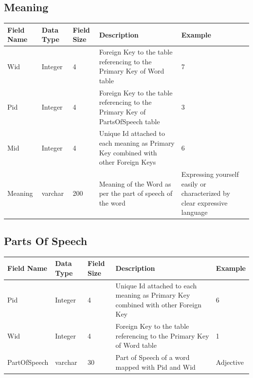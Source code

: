 \documentclass{article}
\begin{document}
\pagebreak
\subsection*{Meaning}
\begin{center}
\begin{tabular}{ |m{2em}|m{2em}|m{2em}|m{7cm}|m{2cm}| } 
 \hline
\large\textbf{Field Name} & \large\textbf{Data Type} & \large\textbf{Field Size} & \large\textbf{Description} & \large\textbf{Example}\\  
 \hline
\small Wid & \small Integer &\small 4 &\small Foreign Key to the table referencing to the Primary Key of Word table &\small 7    \\
\hline
\small Pid & \small Integer &\small 4 &\small Foreign Key to the table referencing to the Primary Key of PartsOfSpeech table &\small 3 \\
\hline
\small Mid & \small Integer &\small 4 &\small Unique Id attached to each meaning as Primary Key combined with other Foreign Keys &\small 6 \\ 
\hline
\small Meaning & \small varchar &\small 200 &\small Meaning of the Word as per the part of speech of the word &\small Expressing yourself easily or characterized by clear expressive language \\
\hline
\end{tabular}
\end{center}

\subsection*{Parts Of Speech}
\begin{center}
\begin{tabular}{ |m{2em}|m{2em}|m{2em}|m{7cm}|m{2cm}| } 
 \hline
\large\textbf{Field Name} & \large\textbf{Data Type} & \large\textbf{Field Size} & \large\textbf{Description} & \large\textbf{Example}\\  
 \hline
\small Pid & \small Integer &\small 4 &\small Unique Id attached to each meaning as Primary Key combined with other Foreign Key &\small 6 \\
\hline
\small Wid & \small Integer &\small 4 &\small Foreign Key to the table referencing to the Primary Key of Word table &\small 1 \\
\hline
\small PartOfSpeech & \small varchar &\small 30 &\small Part of Speech of a word mapped with Pid and Wid &\small Adjective \\
\hline
\end{tabular}
\end{center}
\pagebreak
\end{document}
